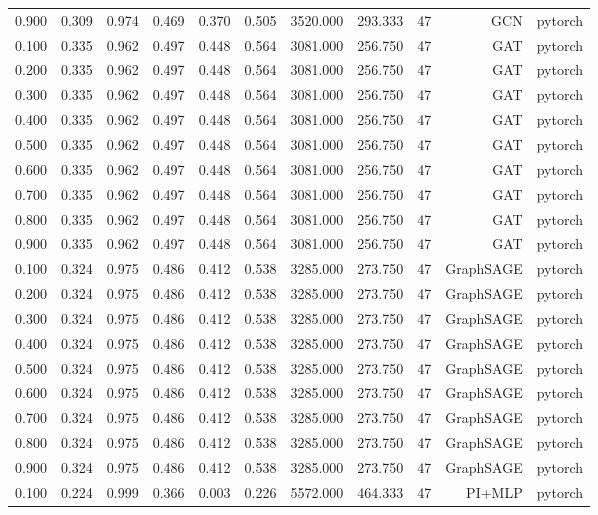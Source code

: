 \begin{tabular}{lrrrrrrrrrr}
0.900 & 0.309 & 0.974 & 0.469 & 0.370 & 0.505 & 3520.000 & 293.333 & 47 & GCN & pytorch \\
0.100 & 0.335 & 0.962 & 0.497 & 0.448 & 0.564 & 3081.000 & 256.750 & 47 & GAT & pytorch \\
0.200 & 0.335 & 0.962 & 0.497 & 0.448 & 0.564 & 3081.000 & 256.750 & 47 & GAT & pytorch \\
0.300 & 0.335 & 0.962 & 0.497 & 0.448 & 0.564 & 3081.000 & 256.750 & 47 & GAT & pytorch \\
0.400 & 0.335 & 0.962 & 0.497 & 0.448 & 0.564 & 3081.000 & 256.750 & 47 & GAT & pytorch \\
0.500 & 0.335 & 0.962 & 0.497 & 0.448 & 0.564 & 3081.000 & 256.750 & 47 & GAT & pytorch \\
0.600 & 0.335 & 0.962 & 0.497 & 0.448 & 0.564 & 3081.000 & 256.750 & 47 & GAT & pytorch \\
0.700 & 0.335 & 0.962 & 0.497 & 0.448 & 0.564 & 3081.000 & 256.750 & 47 & GAT & pytorch \\
0.800 & 0.335 & 0.962 & 0.497 & 0.448 & 0.564 & 3081.000 & 256.750 & 47 & GAT & pytorch \\
0.900 & 0.335 & 0.962 & 0.497 & 0.448 & 0.564 & 3081.000 & 256.750 & 47 & GAT & pytorch \\
0.100 & 0.324 & 0.975 & 0.486 & 0.412 & 0.538 & 3285.000 & 273.750 & 47 & GraphSAGE & pytorch \\
0.200 & 0.324 & 0.975 & 0.486 & 0.412 & 0.538 & 3285.000 & 273.750 & 47 & GraphSAGE & pytorch \\
0.300 & 0.324 & 0.975 & 0.486 & 0.412 & 0.538 & 3285.000 & 273.750 & 47 & GraphSAGE & pytorch \\
0.400 & 0.324 & 0.975 & 0.486 & 0.412 & 0.538 & 3285.000 & 273.750 & 47 & GraphSAGE & pytorch \\
0.500 & 0.324 & 0.975 & 0.486 & 0.412 & 0.538 & 3285.000 & 273.750 & 47 & GraphSAGE & pytorch \\
0.600 & 0.324 & 0.975 & 0.486 & 0.412 & 0.538 & 3285.000 & 273.750 & 47 & GraphSAGE & pytorch \\
0.700 & 0.324 & 0.975 & 0.486 & 0.412 & 0.538 & 3285.000 & 273.750 & 47 & GraphSAGE & pytorch \\
0.800 & 0.324 & 0.975 & 0.486 & 0.412 & 0.538 & 3285.000 & 273.750 & 47 & GraphSAGE & pytorch \\
0.900 & 0.324 & 0.975 & 0.486 & 0.412 & 0.538 & 3285.000 & 273.750 & 47 & GraphSAGE & pytorch \\
0.100 & 0.224 & 0.999 & 0.366 & 0.003 & 0.226 & 5572.000 & 464.333 & 47 & PI+MLP & pytorch \\

\end{tabular}
